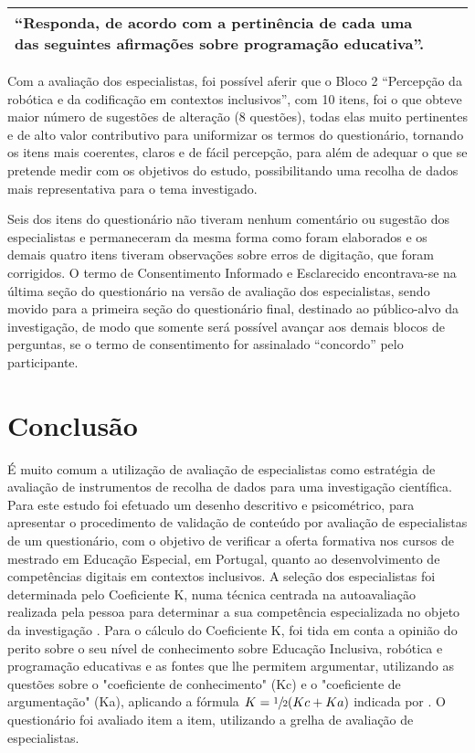 \documentclass[portuguese]{textolivre}
\begin{document}
\begin{table}[h!]
\begin{threeparttable}
\begin{small}
\begin{tabular}{p{0.5cm} >{\raggedright\arraybackslash}p{4.5cm} >{\raggedright\arraybackslash}p{6cm}}
“Responda, de acordo com a pertinência de cada uma das seguintes afirmações sobre programação educativa”. \\
\bottomrule
\end{tabular}
\end{small}
\end{threeparttable}
\end{table}

Com a avaliação dos especialistas, foi possível aferir que o Bloco 2 “Percepção da robótica e da codificação em contextos inclusivos”, com 10 itens, foi o que obteve maior número de sugestões de alteração (8 questões), todas elas muito pertinentes e de alto valor contributivo para uniformizar os termos do questionário, tornando os itens mais coerentes, claros e de fácil percepção, para além de adequar o que se pretende medir com os objetivos do estudo, possibilitando uma recolha de dados mais representativa para o tema investigado.

Seis dos itens do questionário não tiveram nenhum comentário ou sugestão dos especialistas e permaneceram da mesma forma como foram elaborados e os demais quatro itens tiveram observações sobre erros de digitação, que foram corrigidos. O termo de Consentimento Informado e Esclarecido encontrava-se na última seção do questionário na versão de avaliação dos especialistas, sendo movido para a primeira seção do questionário final, destinado ao público-alvo da investigação, de modo que somente será possível avançar aos demais blocos de perguntas, se o termo de consentimento for assinalado “concordo” pelo participante.

\section{Conclusão}\label{sec-autores}
É muito comum a utilização de avaliação de especialistas como estratégia de avaliação de instrumentos de recolha de dados para uma investigação científica. Para este estudo foi efetuado um desenho descritivo e psicométrico, para apresentar o procedimento de validação de conteúdo por avaliação de especialistas de um questionário, com o objetivo de verificar a oferta formativa nos cursos de mestrado em Educação Especial, em Portugal, quanto ao desenvolvimento de competências digitais em contextos inclusivos. A seleção dos especialistas foi determinada pelo Coeficiente K, numa técnica centrada na autoavaliação realizada pela pessoa para determinar a sua competência especializada no objeto da investigação \cite{cabero_almenara_utilizacion_2013}. Para o cálculo do Coeficiente K, foi tida em conta a opinião do perito sobre o seu nível de conhecimento sobre Educação Inclusiva, robótica e programação educativas e as fontes que lhe permitem argumentar, utilizando as questões sobre o "coeficiente de conhecimento" (Kc) e o "coeficiente de argumentação" (Ka), aplicando a fórmula $K= \sfrac{1}{2} (Kc+Ka)$ indicada por \textcite{cabero_almenara_utilizacion_2013}. O questionário foi avaliado item a item, utilizando a grelha de avaliação de especialistas.
\end{document}
